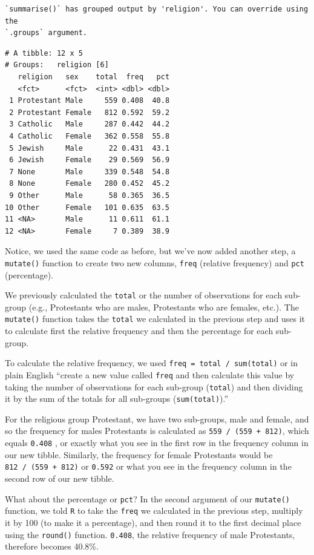 \documentclass[
  letterpaper,
]{book}
\begin{document}
\begin{verbatim}
`summarise()` has grouped output by 'religion'. You can override using the
`.groups` argument.
\end{verbatim}

\begin{verbatim}
# A tibble: 12 x 5
# Groups:   religion [6]
   religion   sex    total  freq   pct
   <fct>      <fct>  <int> <dbl> <dbl>
 1 Protestant Male     559 0.408  40.8
 2 Protestant Female   812 0.592  59.2
 3 Catholic   Male     287 0.442  44.2
 4 Catholic   Female   362 0.558  55.8
 5 Jewish     Male      22 0.431  43.1
 6 Jewish     Female    29 0.569  56.9
 7 None       Male     339 0.548  54.8
 8 None       Female   280 0.452  45.2
 9 Other      Male      58 0.365  36.5
10 Other      Female   101 0.635  63.5
11 <NA>       Male      11 0.611  61.1
12 <NA>       Female     7 0.389  38.9
\end{verbatim}

Notice, we used the same code as before, but we've now added another
step, a \texttt{mutate()} function to create two new columns,
\texttt{freq} (relative frequency) and \texttt{pct} (percentage).

We previously calculated the \texttt{total} or the number of
observations for each sub-group (e.g., Protestants who are males,
Protestants who are females, etc.). The \texttt{mutate()} function takes
the \texttt{total} we calculated in the previous step and uses it to
calculate first the relative frequency and then the percentage for each
sub-group.

To calculate the relative frequency, we used
\texttt{freq\ =\ total\ /\ sum(total)} or in plain English ``create a
new value called \texttt{freq} and then calculate this value by taking
the number of observations for each sub-group (\texttt{total}) and then
dividing it by the sum of the totals for all sub-groups
(\texttt{sum(total)}).''

For the religious group Protestant, we have two sub-groups, male and
female, and so the frequency for males Protestants is calculated as
\texttt{559\ /\ (559\ +\ 812)}, which equals \texttt{0.408} , or exactly
what you see in the first row in the frequency column in our new tibble.
Similarly, the frequency for female Protestants would be
\texttt{812\ /\ (559\ +\ 812)} or \texttt{0.592} or what you see in the
frequency column in the second row of our new tibble.

What about the percentage or \texttt{pct}? In the second argument of our
\texttt{mutate()} function, we told \texttt{R} to take the \texttt{freq}
we calculated in the previous step, multiply it by 100 (to make it a
percentage), and then round it to the first decimal place using the
\texttt{round()} function. \texttt{0.408}, the relative frequency of
male Protestants, therefore becomes 40.8\%.
\end{document}
